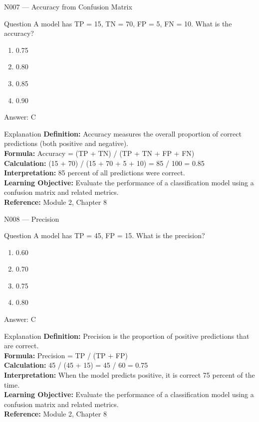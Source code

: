 \documentclass[aspectratio=169,8pt]{beamer}
\begin{document}
	\begin{frame}{N007 --- Accuracy from Confusion Matrix}
		\begin{block}{Question}
			A model has TP = 15, TN = 70, FP = 5, FN = 10. What is the accuracy?
			\begin{enumerate}
				\item 0.75
				\item 0.80
				\item 0.85
				\item 0.90
			\end{enumerate}
		\end{block}
		\begin{exampleblock}{Answer: C}\end{exampleblock}
		\begin{block}{Explanation}
			\textbf{Definition:} Accuracy measures the overall proportion of correct predictions (both positive and negative).\\
			\textbf{Formula:} Accuracy = (TP + TN) / (TP + TN + FP + FN)\\
			\textbf{Calculation:} (15 + 70) / (15 + 70 + 5 + 10) = 85 / 100 = 0.85\\
			\textbf{Interpretation:} 85 percent of all predictions were correct.\\
			\textbf{Learning Objective:} Evaluate the performance of a classification model using a confusion matrix and related metrics.\\
			\textbf{Reference:} Module 2, Chapter 8
		\end{block}
	\end{frame}
	
	\begin{frame}{N008 --- Precision}
		\begin{block}{Question}
			A model has TP = 45, FP = 15. What is the precision?
			\begin{enumerate}
				\item 0.60
				\item 0.70
				\item 0.75
				\item 0.80
			\end{enumerate}
		\end{block}
		\begin{exampleblock}{Answer: C}\end{exampleblock}
		\begin{block}{Explanation}
			\textbf{Definition:} Precision is the proportion of positive predictions that are correct.\\
			\textbf{Formula:} Precision = TP / (TP + FP)\\
			\textbf{Calculation:} 45 / (45 + 15) = 45 / 60 = 0.75\\
			\textbf{Interpretation:} When the model predicts positive, it is correct 75 percent of the time.\\
			\textbf{Learning Objective:} Evaluate the performance of a classification model using a confusion matrix and related metrics.\\
			\textbf{Reference:} Module 2, Chapter 8
		\end{block}
	\end{frame}
	
\end{document}
